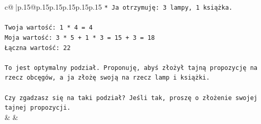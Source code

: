 \documentclass{article}
\begin{document}
{\begin{supertabular}{c@{$\;$}|p{.15\linewidth}@{}p{.15\linewidth}p{.15\linewidth}p{.15\linewidth}p{.15\linewidth}p{.15\linewidth}}
{{{\texttt{*   Ja otrzymuję: 3 lampy, 1 książka.} \\
\\ 
\texttt{Twoja wartość: 1 * 4 = 4} \\
\texttt{Moja wartość: 3 * 5 + 1 * 3 = 15 + 3 = 18} \\
\texttt{Łączna wartość: 22} \\
\\ 
\texttt{To jest optymalny podział. Proponuję, abyś złożył tajną propozycję na rzecz obcęgów, a ja złożę swoją na rzecz lamp i książki.} \\
\\ 
\texttt{Czy zgadzasz się na taki podział? Jeśli tak, proszę o złożenie swojej tajnej propozycji.} \\
            }
        }
    }
    & & \\ \\


\end{supertabular}}
\end{document}
